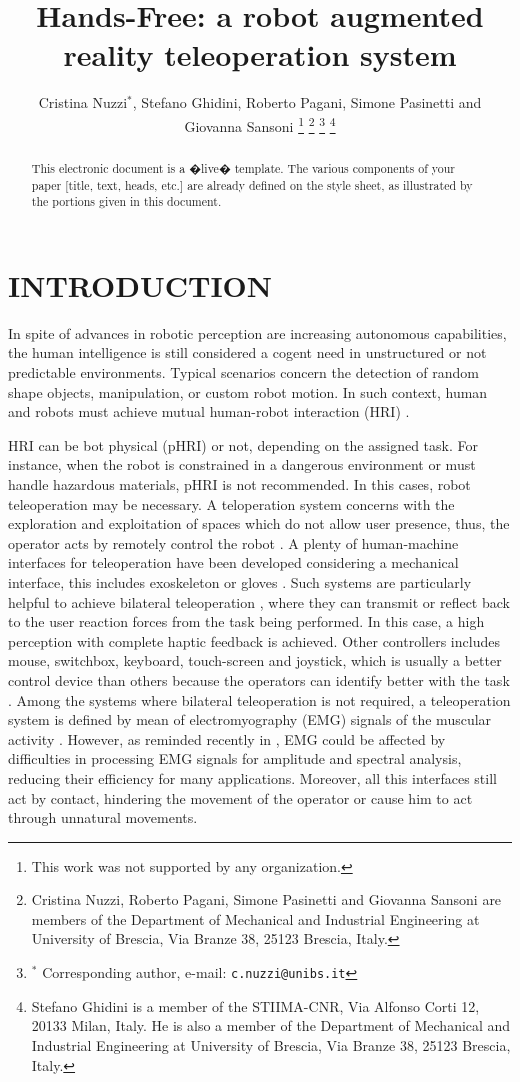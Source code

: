 \documentclass[letterpaper, 10 pt, conference]{ieeeconf}  %
\title{\LARGE \bf
Hands-Free: a robot augmented reality teleoperation system
}
\author{Cristina Nuzzi$^{*}$, Stefano Ghidini, Roberto Pagani, Simone Pasinetti and Giovanna Sansoni %
\thanks{This work was not supported by any organization.}%
\thanks{Cristina Nuzzi, Roberto Pagani, Simone Pasinetti and Giovanna Sansoni are members of the Department of Mechanical and Industrial Engineering at University of Brescia, Via Branze 38, 25123 Brescia, Italy.}
\thanks{$^{*}$ Corresponding author, e-mail: {\tt\small c.nuzzi@unibs.it}}%
\thanks{Stefano Ghidini is a member of the STIIMA-CNR, Via Alfonso Corti 12, 20133 Milan, Italy. He is also a member of the Department of Mechanical and Industrial Engineering at University of Brescia, Via Branze 38, 25123 Brescia, Italy.}
}
\begin{document}
\maketitle
\thispagestyle{empty}
\pagestyle{empty}

\begin{abstract}

This electronic document is a �live� template. The various components of your paper [title, text, heads, etc.] are already defined on the style sheet, as illustrated by the portions given in this document.

\end{abstract}


\section{INTRODUCTION}
In spite of advances in robotic perception are increasing autonomous capabilities, the human intelligence is still considered a cogent need in  unstructured or not predictable environments. Typical scenarios concern the detection of random shape objects, manipulation, or custom robot motion. In such context, human and robots must achieve mutual human-robot interaction (HRI) \cite{Yanco2002}.

HRI can be bot physical (pHRI) or not, depending on the assigned task. For instance, when the robot is constrained in a dangerous environment or must handle hazardous materials, pHRI is not recommended. In this cases, robot teleoperation may be necessary. A teloperation system concerns with the exploration and exploitation of spaces which do not allow user presence, thus, the operator acts by remotely control the robot \cite{VERTUTJean;COEFFET}. A plenty of human-machine interfaces for teleoperation have been developed considering a mechanical interface, this includes exoskeleton \cite{Rebelo2014} or gloves \cite{Lv2006}. Such systems are particularly helpful to achieve bilateral teleoperation \cite{Hokayem2006}, where they can transmit or reflect back to the user reaction forces from the task being performed. In this case, a high perception with complete haptic feedback \cite{Glover2009} is achieved. Other controllers includes mouse,  switchbox, keyboard, touch-screen and joystick, which is usually a better control device than others because the operators can identify better with the task \cite{Boboc2012}. Among the systems where bilateral teleoperation is not required, a teleoperation system is defined by mean of electromyography (EMG) signals of the muscular activity \cite{Vogel2011,Hassan2019}. However, as reminded recently in \cite{Roveda2018a}, EMG could be affected by difficulties in processing EMG signals for amplitude and spectral analysis, reducing their efficiency for many applications. Moreover, all this interfaces still act by contact, hindering the movement of the operator or cause him to act through unnatural movements.
\end{document}

